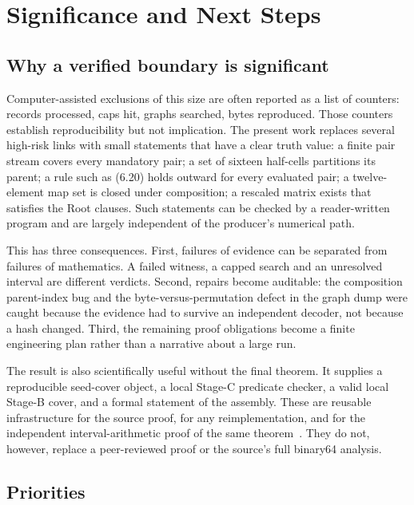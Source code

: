 \documentclass[10pt]{article}
\theoremstyle{definition}
\begin{document}
\section{Significance and Next Steps}
\label{sec:significance}

\subsection{Why a verified boundary is significant}

Computer-assisted exclusions of this size are often reported as a list of counters: records processed, caps hit, graphs searched, bytes reproduced. Those counters establish reproducibility but not implication. The present work replaces several high-risk links with small statements that have a clear truth value: a finite pair stream covers every mandatory pair; a set of sixteen half-cells partitions its parent; a rule such as (6.20) holds outward for every evaluated pair; a twelve-element map set is closed under composition; a rescaled matrix exists that satisfies the Root clauses. Such statements can be checked by a reader-written program and are largely independent of the producer's numerical path.

This has three consequences. First, failures of evidence can be separated from failures of mathematics. A failed witness, a capped search and an unresolved interval are different verdicts. Second, repairs become auditable: the composition parent-index bug and the byte-versus-permutation defect in the graph dump were caught because the evidence had to survive an independent decoder, not because a hash changed. Third, the remaining proof obligations become a finite engineering plan rather than a narrative about a large run.

The result is also scientifically useful without the final theorem. It supplies a reproducible seed-cover object, a local Stage-C predicate checker, a valid local Stage-B cover, and a formal statement of the assembly. These are reusable infrastructure for the source proof, for any reimplementation, and for the independent interval-arithmetic proof of the same theorem~\cite{WT26}. They do not, however, replace a peer-reviewed proof or the source's full binary64 analysis.

\subsection{Priorities}
\end{document}
